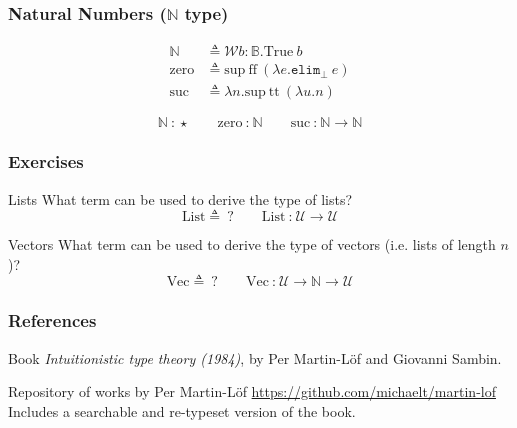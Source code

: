 \documentclass[mathserif,usenames,dvipsnames]{beamer}
\newcommand{\txt}[1]{\textrm{#1}}
\newcommand{\defeq}[0]{\ensuremath{\triangleq}}
\newcommand{\isterm}[2]{\ensuremath{#1 ~\textbf{{:}}~ #2}}
\newcommand{\Arr}[2]{\ensuremath{#1 \rightarrow #2}}
\newcommand{\funv}[2]{\ensuremath{\lambda #1. #2}}
\newcommand{\fst}[1]{\ensuremath{\pi_1~#1}}
\newcommand{\Type}[0]{\ensuremath{\mathcal{U}}}
\newcommand{\Bot}[0]{\ensuremath{\bot}}
\newcommand{\elimBot}[1]{\ensuremath{\texttt{elim}_{\Bot}~#1}}
\newcommand{\Truek}[0]{\txt{True}}
\newcommand{\True}[1]{\ensuremath{\Truek~#1}}
\newcommand{\Bool}[0]{\ensuremath{\mathbb{B}}}
\newcommand{\true}[0]{\ensuremath{\txt{tt}}}
\newcommand{\false}[0]{\ensuremath{\txt{ff}}}
\newcommand{\elimBool}[3]{\ensuremath{\texttt{elim}_{\Bool}~#1~#2~#3}}
\newcommand{\Listk}[0]{\ensuremath{\txt{List}}}
\newcommand{\Vectk}[0]{\ensuremath{\txt{Vec}}}
\newcommand{\Nat}[0]{\ensuremath{\mathbb{N}}}
\newcommand{\zero}[0]{\ensuremath{\txt{zero}}}
\newcommand{\suck}[0]{\ensuremath{\txt{suc}}}
\newcommand{\elimNatk}[0]{\ensuremath{\txt{elim}_\Nat}}
\newcommand{\elimNat}[3]{\ensuremath{\elimNatk~#1~#2~#3}}
\newcommand{\Wellk}[0]{\ensuremath{\mathcal{W}}}
\newcommand{\Wellv}[3]{\ensuremath{\Wellk #1{:}#2. #3}}
\newcommand{\suprk}[0]{\ensuremath{\txt{sup}}}
\newcommand{\supr}[2]{\suprk~#1~#2}
\begin{document}
\begin{frame}
\frametitle{Natural Numbers ($\Nat$ type)}

\begin{align*}
\Nat &\defeq \Wellv{b}{\Bool}{\True{b}} \\
\zero &\defeq \supr{\false}{(\funv{e}{\elimBot{e}})} \\
\suck &\defeq \funv{n}{\supr{\true}{(\funv{u}{n})}}
\end{align*}

$$
\isterm{\Nat}{\star}
\qquad
\isterm{\zero}{\Nat}
\qquad
\isterm{\suck}{\Arr{\Nat}{\Nat}}
$$

\end{frame}

\begin{frame}
\frametitle{Exercises}

\begin{block}{Lists}
What term can be used to derive the type of lists?
$$
\Listk \defeq ~?
\qquad
\isterm{\Listk}{\Arr{\Type}{\Type}}
$$
\end{block}

\begin{block}{Vectors}
What term can be used to derive the type of
vectors (i.e. lists of length $n$)?
$$
\Vectk \defeq ~?
\qquad
\isterm{\Vectk}{\Arr{\Type}{\Arr{\Nat}{\Type}}}
$$
\end{block}

\end{frame}

\begin{frame}
\frametitle{References}

\begin{block}{Book}
\textit{Intuitionistic type theory (1984)}, by
Per Martin-L{\"o}f and Giovanni Sambin.
\end{block}

\begin{block}{Repository of works by Per Martin-L{\"o}f}
\url{https://github.com/michaelt/martin-lof}\\
Includes a searchable and re-typeset version of the book.
\end{block}

\end{frame}
\end{document}
